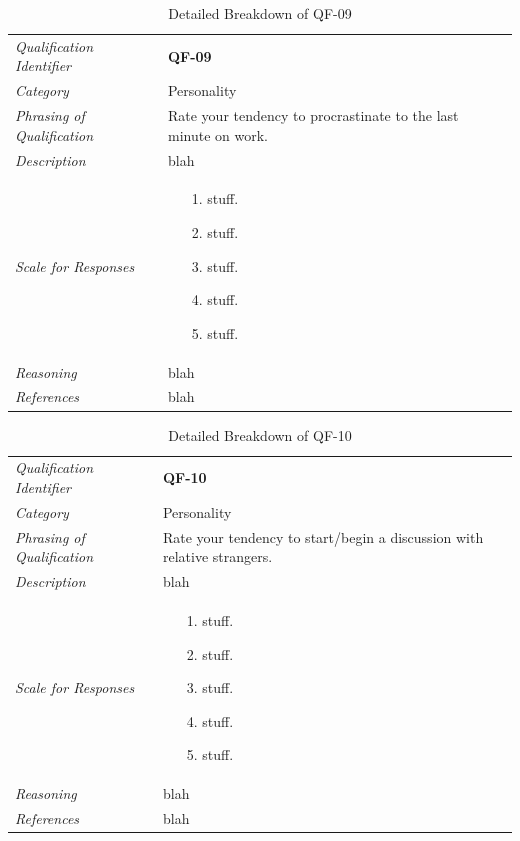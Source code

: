 \documentclass[12pt,letterpaper]{article}
\begin{document}
\begin{table}[H]
	\caption{Detailed Breakdown of QF-09}
	\begin{tabu} to 
		\toprule
		Qualification Identifier & {\bf QF-09}\\
		Category & Personality \\
		Phrasing of Qualification & Rate your tendency to procrastinate to the last minute on work. \\
		Description & blah\\
		Scale for Responses &
		\begin{minipage}[t]{\linewidth}
			\begin{enumerate}
				\item[1.] stuff.
				\item[2.] stuff.
				\item[3.] stuff.
				\item[4.] stuff.
				\item[5.] stuff.
			\end{enumerate}
		\end{minipage}\\
		Reasoning & blah\\
		References & blah\\
		\toprule
	\end{tabu}
\end{table}

\begin{table}[H]
	\caption{Detailed Breakdown of QF-10}
	\begin{tabu} to 
		\toprule
		Qualification Identifier & {\bf QF-10}\\
		Category & Personality \\
		Phrasing of Qualification & Rate your tendency to start/begin a discussion with relative strangers. \\
		Description & blah\\
		Scale for Responses &
		\begin{minipage}[t]{\linewidth}
			\begin{enumerate}
				\item[1.] stuff.
				\item[2.] stuff.
				\item[3.] stuff.
				\item[4.] stuff.
				\item[5.] stuff.
			\end{enumerate}
		\end{minipage}\\
		Reasoning & blah\\
		References & blah\\
		\toprule
	\end{tabu}
\end{table}
\end{document}
